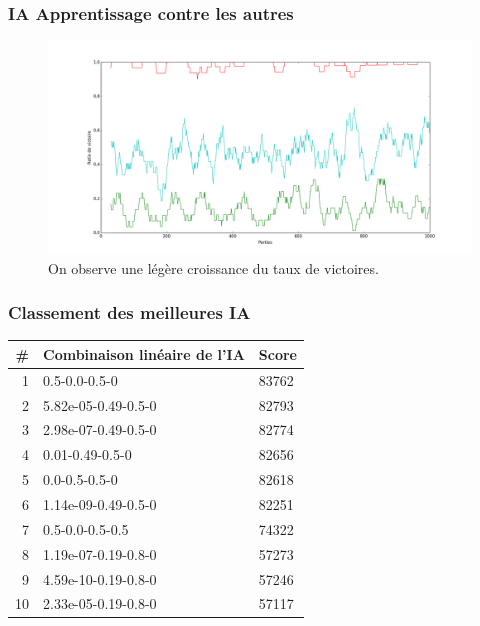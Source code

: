 \documentclass{beamer}
\begin{document}
\begin{frame}
  \frametitle{IA Apprentissage contre les autres}
  \begin{figure}
    \includegraphics[scale=0.265]{plot/eleve}
    \caption{
      \label{fig_eleve} On observe une légère croissance du taux de victoires.
    }
  \end{figure}
\end{frame}

\begin{frame}
  \frametitle{Classement des meilleures IA}
  \begin{center}
    \begin{tabular}{| r | l | l |}
      \hline
      \# & Combinaison linéaire de l'IA                          & Score \\
      \hline
      1  & 0.5-0.0-0.5-0                                         & 83762 \\
      2  & 5.82e-05-0.49-0.5-0                & 82793 \\
      3  & 2.98e-07-0.49-0.5-0                & 82774 \\
      4  & 0.01-0.49-0.5-0                 & 82656 \\
      5  & 0.0-0.5-0.5-0                                         & 82618 \\
      6  & 1.14e-09-0.49-0.5-0                & 82251 \\
      7  & 0.5-0.0-0.5-0.5                                       & 74322 \\
      8  & 1.19e-07-0.19-0.8-0                & 57273 \\
      9  & 4.59e-10-0.19-0.8-0                 & 57246 \\
      10 & 2.33e-05-0.19-0.8-0                & 57117 \\
      \hline
    \end{tabular}
  \end{center}
\end{frame}
\end{document}
